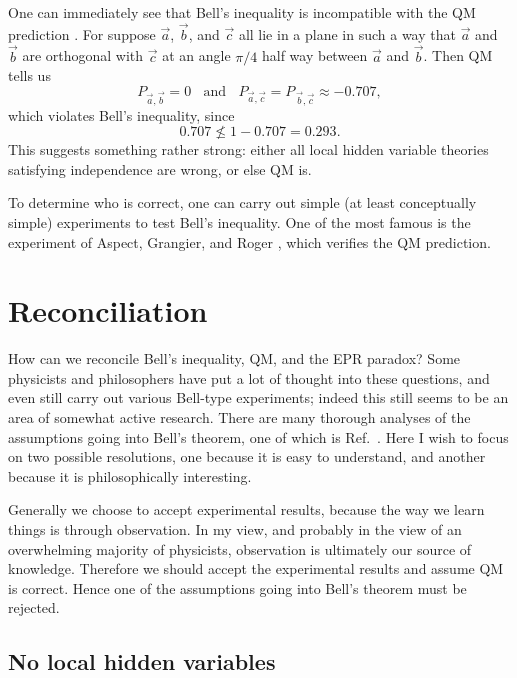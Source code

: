 One can immediately see that Bell's inequality is incompatible with
the QM prediction . For suppose $\vec{a}$, $\vec{b}$,
and $\vec{c}$ all lie in a plane in such a way that $\vec{a}$ and $\vec{b}$
are orthogonal with $\vec{c}$ at an angle $\pi/4$ half way between
$\vec{a}$ and $\vec{b}$. Then QM tells us
\begin{equation}
  P_{\vec{a},\vec{b}}=0~~~~\text{and}~~~~
  P_{\vec{a},\vec{c}}=P_{\,\vec{b},\vec{c}}\approx-0.707,
\end{equation}
which violates Bell's inequality, since
\begin{equation}
  0.707\nleq1-0.707=0.293.
\end{equation}
This suggests something rather strong: either all local hidden variable 
theories satisfying independence are wrong, or else QM is.

To determine who is correct, one can carry out simple (at least conceptually
simple) experiments to test Bell's inequality. One of the most famous
is the experiment of Aspect, Grangier, and Roger
\cite{aspect_experimental_1982}, which verifies the QM prediction. 

\section{Reconciliation}\label{sec:interpretingBell}

How can we reconcile Bell's inequality, QM, and the EPR paradox? Some
physicists and philosophers have put a lot of thought into these questions,
and even still carry out various Bell-type experiments;
indeed this still seems to be an area of somewhat active research.
There are many thorough analyses of the assumptions going into Bell's
theorem, one of which is Ref.~\cite{platoStanfordBell}. Here I wish
to focus on two possible resolutions, one because it is
easy to understand, and another because it is philosophically interesting.

Generally we choose to accept experimental results, because the way we
learn things is through observation. In my view, and probably in the view
of an overwhelming majority of physicists, observation is ultimately
our source of knowledge. Therefore we should accept the experimental
results and assume QM is correct. Hence one of the assumptions going into
Bell's theorem must be rejected.

\subsection{No local hidden variables}


